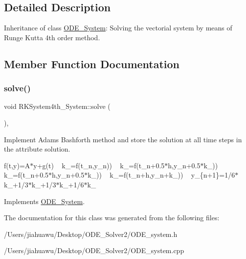 \subsection{Detailed Description}
Inheritance of class \mbox{\hyperlink{class_o_d_e___system}{O\+D\+E\+\_\+\+System}}\+: Solving the vectorial system by means of Runge Kutta 4th order method. 

\subsection{Member Function Documentation}
\mbox{\label{class_r_k_system4th___system_ae7e9125546c6590f50d581f5e6668c82}} 
\subsubsection{\texorpdfstring{solve()}{solve()}}
{\footnotesize\ttfamily void R\+K\+System4th\+\_\+\+System\+::solve (\begin{DoxyParamCaption}{ }\end{DoxyParamCaption})\hspace{0.3cm}{\ttfamily [override]}, {\ttfamily [virtual]}}



Implement Adams Bashforth method and store the solution at all time steps in the attribute solution. 

f(t,y)=A$\ast$y+g(t) ~\newline
k\+\_=f(t\+\_\+n,y\+\_\+n)) ~\newline
k\+\_=f(t\+\_\+n+0.5$\ast$h,y\+\_\+n+0.5$\ast$k\+\_)) ~\newline
k\+\_=f(t\+\_\+n+0.5$\ast$h,y\+\_\+n+0.5$\ast$k\+\_)) ~\newline
k\+\_=f(t\+\_\+n+h,y\+\_\+n+k\+\_)) ~\newline
y\+\_\+\{n+1\}=1/6$\ast$k\+\_+1/3$\ast$k\+\_+1/3$\ast$k\+\_+1/6$\ast$k\+\_ ~\newline


Implements \mbox{\hyperlink{class_o_d_e___system_a78a058382148b745fa458f0b9f52f47c}{O\+D\+E\+\_\+\+System}}.



The documentation for this class was generated from the following files\+:\begin{DoxyCompactItemize}
\item 
/\+Users/jiahuawu/\+Desktop/\+O\+D\+E\+\_\+\+Solver2/O\+D\+E\+\_\+system.\+h\item 
/\+Users/jiahuawu/\+Desktop/\+O\+D\+E\+\_\+\+Solver2/O\+D\+E\+\_\+system.\+cpp\end{DoxyCompactItemize}
